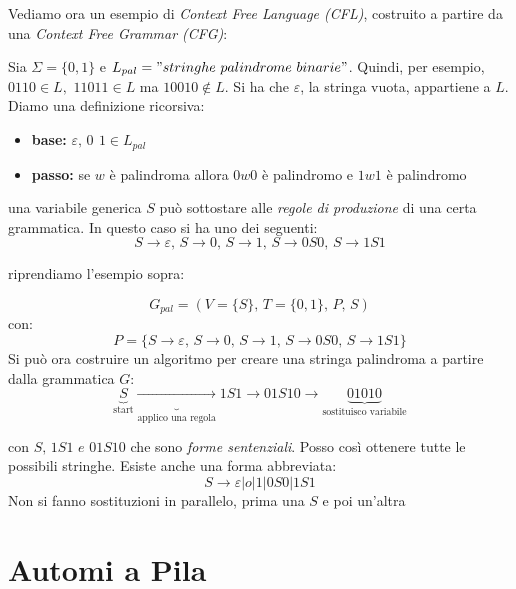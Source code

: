 Vediamo ora un esempio di \textit{Context Free Language (CFL)}, costruito a partire da una \textit{Context Free Grammar (CFG)}:
\begin{example}
	Sia $\Sigma=\{0, 1\}$ e $L_{pal}="stringhe\,\, palindrome\,\, binarie"$.
	Quindi, per esempio, $0110\in L,\,\, 11011\in L$ ma $10010\not\in L$. Si ha che $\varepsilon$, la stringa vuota, appartiene a $L$. Diamo una definizione ricorsiva:
	\begin{itemize}
		\item \textbf{base:} $\varepsilon,\, 0\,\ 1\in L_{pal}$
		\item \textbf{passo:} se $w$ è palindroma allora $0w0$ è palindromo e $1w1$ è palindromo
	\end{itemize}
	una variabile generica $S$ può sottostare alle \textit{regole di produzione} di una certa grammatica. In questo caso si ha uno dei seguenti:
	$$S\to\varepsilon,\, S\to 0,\, S\to 1,\, S\to 0S0,\, S\to 1S1$$
\end{example}


riprendiamo l'esempio sopra:
\begin{example}
	$$G_{pal}=(V=\{S\},\, T=\{0, 1\},\, P,\, S)$$
	con:
	$$P=\{S\to\varepsilon,\, S\to 0,\, S\to 1,\, S\to 0S0,\, S\to 1S1\}$$
	Si può ora costruire un algoritmo per creare una stringa palindroma a partire dalla grammatica $G$:
	$$\underbrace{S}_{\mbox{start}}\underbrace{\to}_{\mbox{applico una regola}} 1S1 \to 01S10\to \underbrace{01010}_{\mbox{sostituisco variabile}}$$

	con $S,\, 1S1\,\, e\,\, 01S10$ che sono \textit{forme sentenziali}. Posso così ottenere tutte le possibili stringhe. Esiste anche una forma abbreviata:
	$$S\to \varepsilon|o|1|0S0|1S1$$
	Non si fanno sostituzioni in parallelo, prima una $S$ e poi un'altra
\end{example}


\section{Automi a Pila}\label{sec:automi-pila}

